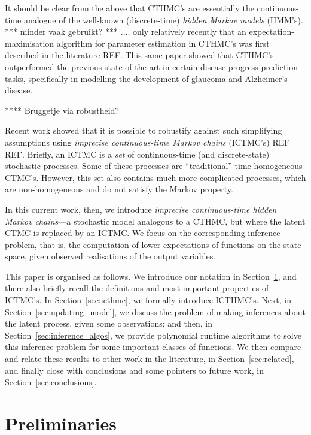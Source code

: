 \documentclass[twoside,11pt]{article}
\begin{document}
It should be clear from the above that CTHMC's are essentially the continuous-time analogue of the well-known (discrete-time) \emph{hidden Markov models} (HMM's). *** minder vaak gebruikt? *** .... only relatively recently that an expectation-maximisation algorithm for parameter estimation in CTHMC's was first described in the literature REF. This same paper showed that CTHMC's outperformed the previous state-of-the-art in certain disease-progress prediction tasks, specifically in modelling the development of glaucoma and Alzheimer's disease.

**** Bruggetje via robustheid?

Recent work showed that it is possible to robustify against such simplifying assumptions using \emph{imprecise continuous-time Markov chains} (ICTMC's) REF REF. Briefly, an ICTMC is a \emph{set} of continuous-time (and discrete-state) stochastic processes. Some of these processes are ``traditional'' time-homogeneous CTMC's. However, this set also contains much more complicated processes, which are non-homogeneous and do not satisfy the Markov property.

In this current work, then, we introduce \emph{imprecise continuous-time hidden Markov chains}---a stochastic model analogous to a CTHMC, but where the latent CTMC is replaced by an ICTMC. We focus on the corresponding inference problem, that is, the computation of lower expectations of functions on the state-space, given observed realisations of the output variables.

This paper is organised as follows. We introduce our notation in Section~\ref{sec:prelim}, and there also briefly recall the definitions and most important properties of ICTMC's. In Section~\ref{sec:icthmc}, we formally introduce ICTHMC's. Next, in Section~\ref{sec:updating_model}, we discuss the problem of making inferences about the latent process, given some observations; and then, in Section~\ref{sec:inference_algos}, we provide polynomial runtime algorithms to solve this inference problem for some important classes of functions. We then compare and relate these results to other work in the literature, in Section~\ref{sec:related}, and finally close with conclusions and some pointers to future work, in Section~\ref{sec:conclusions}.

\section{Preliminaries}\label{sec:prelim}
\end{document}

